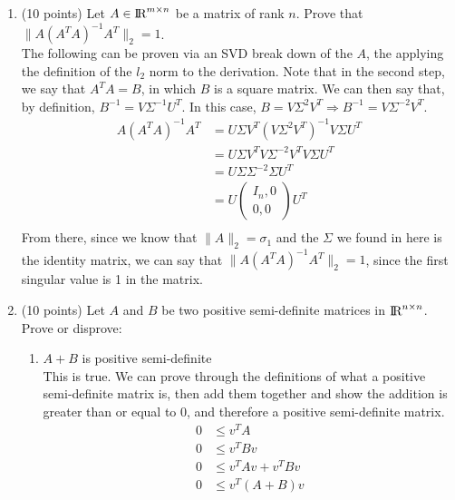 \documentclass[11pt]{article}
\begin{document}
\begin{enumerate}

\item (10 points) Let $A \in {\rm\hbox{I\kern-.15em R}}^{m \times n}$ be a matrix of rank $n$. Prove that $\| A(A^T A)^{-1} A^T \|_2 = 1$. \\
The following can be proven via an SVD break down of the $A$, the applying the definition of the $l_2$ norm to the 
derivation. Note that in the second step, we say that $A^TA = B$, in which $B$ is a square matrix. We can then say
that, by definition, $B^{-1} = V \Sigma^{-1} U^T$. In this case, $B = V \Sigma^2 V^T \Rightarrow B^{-1} = V \Sigma^{-2} V^T$.
\begin{align*}
    A(A^T A)^{-1} A^T &= U \Sigma V^T (V \Sigma^2 V^T)^{-1} V \Sigma U^T\\
                      &= U \Sigma V^T V \Sigma^{-2} V^T V \Sigma U^T \\
                      &= U \Sigma \Sigma^{-2}  \Sigma U^T \\
                      &= U \begin{pmatrix} I_n, 0 \\ 0, 0 \end{pmatrix} U^T \\
\end{align*}
From there, since we know that $ \| A \|_2 = \sigma_1$ and the $\Sigma$ we found in here is the identity matrix, we can 
say that $\| A(A^T A)^{-1} A^T \|_2 = 1$, since the first singular value is 1 in the matrix.

\item (10 points) Let $A$ and $B$ be two positive semi-definite matrices in ${\rm\hbox{I\kern-.15em R}}^{n \times n}$. Prove or disprove: 
\begin{enumerate}
\item $A+ B$ is positive semi-definite\\
This is true. We can prove through the definitions of what a positive semi-definite matrix is, then add them together
and show the addition is greater than or equal to 0, and therefore a positive semi-definite matrix.
\begin{align*}
    0 &\leq v^T A \\   
    0 &\leq v^T B v \\  
    0 &\leq v^T A v + v^T B v   \\
    0 &\leq v^T (A + B) v   \\
\end{align*}


\end{enumerate}
\end{enumerate}
\end{document}
